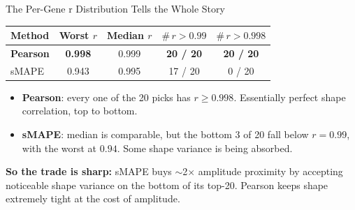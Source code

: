 \documentclass[aspectratio=169,12pt,handout]{beamer}
\begin{document}
\begin{frame}{The Per-Gene r Distribution Tells the Whole Story}
\small
\begin{center}
\begin{tabular}{lcccc}
\toprule
\textbf{Method} & \textbf{Worst $r$} & \textbf{Median $r$} & \textbf{$\#\,r > 0.99$} & \textbf{$\#\,r > 0.998$} \\
\midrule
\textbf{Pearson} & \textbf{0.998} & 0.999 & \textbf{20 / 20} & \textbf{20 / 20} \\
sMAPE   & 0.943 & 0.995 & 17 / 20 & 0 / 20 \\
\bottomrule
\end{tabular}
\end{center}
\vspace{0.5em}
\begin{itemize}
  \item \textbf{Pearson}: every one of the 20 picks has $r \geq 0.998$. Essentially perfect shape correlation, top to bottom.
  \item \textbf{sMAPE}: median is comparable, but the bottom 3 of 20 fall below $r = 0.99$, with the worst at $0.94$. Some shape variance is being absorbed.
\end{itemize}
\vspace{0.4em}
\textcolor{binggreen}{\textbf{So the trade is sharp:}} sMAPE buys $\sim$2$\times$ amplitude proximity by accepting noticeable shape variance on the bottom of its top-20. Pearson keeps shape extremely tight at the cost of amplitude.
\end{frame}
\end{document}
